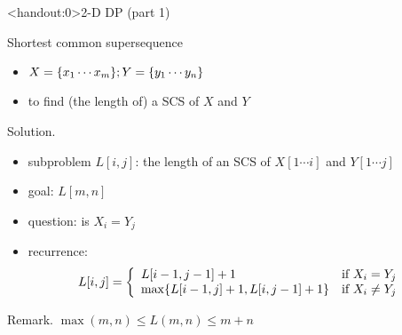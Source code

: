 \begin{frame}<handout:0>{2-D DP (part 1)}
  \begin{exampleblock}{Shortest common supersequence }
    \begin{itemize}
      \item $X = \{x_{1} \cdots x_{m}\}; Y = \{y_{1} \cdots y_{n}\}$
      \item to find (the length of) a SCS of $X$ and $Y$
    \end{itemize}
  \end{exampleblock}

  \begin{block}{Solution.}
    \begin{itemize}
      \item subproblem $L[i,j]$: the length of an SCS of $X[1 \cdots i]$ and $Y[1 \cdots j]$
      \item goal: $L[m,n]$
      \item question: is $X_{i} = Y_{j}$
      \item recurrence:
	\begin{displaymath}
	  L[i,j] = \left\{ \begin{array}{ll}
	    L[i-1, j-1] + 1 & \textrm{if $X_{i} = Y_{j}$}\\
	    \max \{L[i-1,j] + 1, L[i,j-1] + 1\} & \textrm{if $X_{i} \neq Y_{j}$}
	  \end{array} \right.
	\end{displaymath}
    \end{itemize}
  \end{block}

  \begin{alertblock}{Remark.}
    $\max(m,n) \le L(m,n) \le m+n$
  \end{alertblock}
\end{frame}

